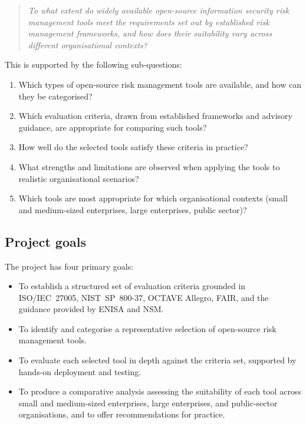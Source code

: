 \begin{quote}
\textit{To what extent do widely available open-source information security
risk management tools meet the requirements set out by established risk
management frameworks, and how does their suitability vary across different
organisational contexts?}
\end{quote}

This is supported by the following sub-questions:

\begin{enumerate}
    \item Which types of open-source risk management tools are available,
          and how can they be categorised?
    \item Which evaluation criteria, drawn from established frameworks and
          advisory guidance, are appropriate for comparing such tools?
    \item How well do the selected tools satisfy these criteria in
          practice?
    \item What strengths and limitations are observed when applying the
          tools to realistic organisational scenarios?
    \item Which tools are most appropriate for which organisational
          contexts (small and medium-sized enterprises, large enterprises,
          public sector)?
\end{enumerate}

\subsection{Project goals}

The project has four primary goals:
\begin{itemize}
    \item To establish a structured set of evaluation criteria grounded in
          ISO/IEC~27005, NIST~SP~800-37, OCTAVE Allegro, FAIR, and the
          guidance provided by ENISA and NSM.
    \item To identify and categorise a representative selection of
          open-source risk management tools.
    \item To evaluate each selected tool in depth against the criteria set,
          supported by hands-on deployment and testing.
    \item To produce a comparative analysis assessing the suitability of
          each tool across small and medium-sized enterprises, large
          enterprises, and public-sector organisations, and to offer
          recommendations for practice.
\end{itemize}

